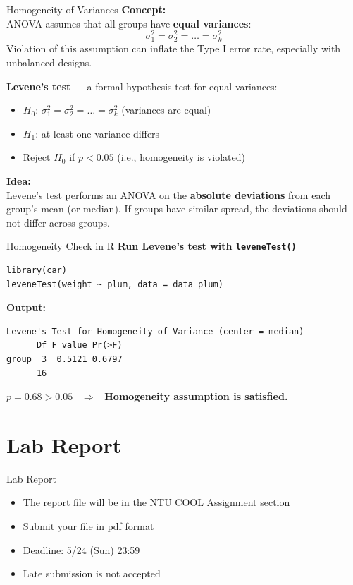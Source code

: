 \documentclass[aspectratio=169]{beamer}
\begin{document}
\begin{frame}{Homogeneity of Variances}
\textbf{Concept:}\\
\vspace{4pt}
ANOVA assumes that all groups have \textbf{equal variances}:
\[
\sigma_1^2 = \sigma_2^2 = \dots = \sigma_k^2
\]
Violation of this assumption can inflate the Type I error rate, especially with unbalanced designs.\\
\vspace{10pt}

\textbf{Levene's test} --- a formal hypothesis test for equal variances:
\begin{itemize}\setlength{\itemsep}{6pt}
  \item $H_0$: $\sigma_1^2 = \sigma_2^2 = \dots = \sigma_k^2$ \quad (variances are equal)
  \item $H_1$: at least one variance differs
  \item Reject $H_0$ if $p < 0.05$ (i.e., homogeneity is violated)
\end{itemize}
\vspace{8pt}

\textbf{Idea:}\\
Levene's test performs an ANOVA on the \textbf{absolute deviations} from each group's mean (or median). If groups have similar spread, the deviations should not differ across groups.
\end{frame}


\begin{frame}[fragile]{Homogeneity Check in R}
\textbf{Run Levene's test with \texttt{leveneTest()}}
\begin{lstlisting}
library(car)
leveneTest(weight ~ plum, data = data_plum)
\end{lstlisting}

\vspace{4pt}
\textbf{Output:}
\begin{lstlisting}[numbers=none, backgroundcolor=\color{yellow!8}]
Levene's Test for Homogeneity of Variance (center = median)
      Df F value Pr(>F)
group  3  0.5121 0.6797
      16
\end{lstlisting}

\vspace{6pt}
$p = 0.68 > 0.05$ \ $\Rightarrow$ \ \textbf{Homogeneity assumption is satisfied.}
\end{frame}



\section{Lab Report}
\begin{frame}{Lab Report}
\begin{itemize}
    \item The report file will be in the NTU COOL Assignment section
    \item Submit your file in pdf format
    \item Deadline: 5/24 (Sun) 23:59
    \item Late submission is not accepted
\end{itemize}
\end{frame}
\end{document}
